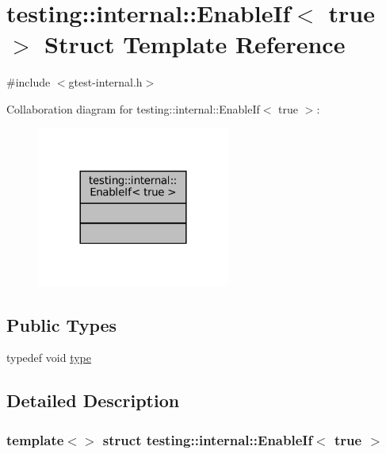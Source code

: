 \hypertarget{structtesting_1_1internal_1_1EnableIf_3_01true_01_4}{}\section{testing\+:\+:internal\+:\+:Enable\+If$<$ true $>$ Struct Template Reference}
\label{structtesting_1_1internal_1_1EnableIf_3_01true_01_4}


{\ttfamily \#include $<$gtest-\/internal.\+h$>$}



Collaboration diagram for testing\+:\+:internal\+:\+:Enable\+If$<$ true $>$\+:
\nopagebreak
\begin{figure}[H]
\begin{center}
\leavevmode
\includegraphics[width=180pt]{structtesting_1_1internal_1_1EnableIf_3_01true_01_4__coll__graph}
\end{center}
\end{figure}
\subsection*{Public Types}
\begin{DoxyCompactItemize}
\item 
typedef void \hyperlink{structtesting_1_1internal_1_1EnableIf_3_01true_01_4_a9398d803f1fdd99ff41823746f6299ff}{type}
\end{DoxyCompactItemize}


\subsection{Detailed Description}
\subsubsection*{template$<$$>$\newline
struct testing\+::internal\+::\+Enable\+If$<$ true $>$}



